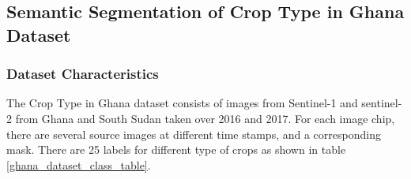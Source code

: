 \documentclass[conference]{IEEEtran}
\begin{document}
\subsection{Semantic Segmentation of Crop Type in Ghana Dataset}
\subsubsection{Dataset Characteristics}
The Crop Type in Ghana dataset \cite{Rustowicz2019SemanticSO} consists of images from Sentinel-1 and sentinel-2 from Ghana and South Sudan taken over 2016 and 2017. For each image chip, there are several source images at different time stamps, and a corresponding mask. There are 25 labels for different type of crops as shown in table \ref{ghana_dataset_class_table}.  


\end{document}
